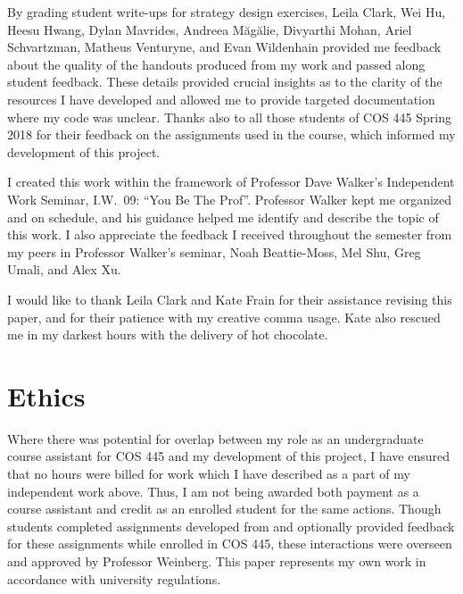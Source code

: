 \documentclass[pageno]{jpaper}
\begin{document}
By grading student write-ups for strategy design exercises, Leila Clark, Wei Hu, Heesu Hwang, Dylan Mavrides, Andreea M\u{a}g\u{a}lie, Divyarthi Mohan, Ariel Schvartzman, Matheus Venturyne, and Evan Wildenhain provided me feedback about the quality of the handouts produced from my work and passed along student feedback.
These details provided crucial insights as to the clarity of the resources I have developed and allowed me to provide targeted documentation where my code was unclear.
Thanks also to all those students of COS 445 Spring 2018 for their feedback on the assignments used in the course, which informed my development of this project.

I created this work within the framework of Professor Dave Walker's Independent Work Seminar, I.W.\ 09: ``You Be The Prof''.
Professor Walker kept me organized and on schedule, and his guidance helped me identify and describe the topic of this work.
I also appreciate the feedback I received throughout the semester from my peers in Professor Walker's seminar, Noah Beattie-Moss, Mel Shu, Greg Umali, and Alex Xu.

I would like to thank Leila Clark and Kate Frain for their assistance revising this paper, and for their patience with my creative comma usage.
Kate also rescued me in my darkest hours with the delivery of hot chocolate.

\section*{Ethics}
Where there was potential for overlap between my role as an undergraduate course assistant for COS 445 and my development of this project, I have ensured that no hours were billed for work which I have described as a part of my independent work above.
Thus, I am not being awarded both payment as a course assistant and credit as an enrolled student for the same actions.
Though students completed assignments developed from and optionally provided feedback for these assignments while enrolled in COS 445, these interactions were overseen and approved by Professor Weinberg.
This paper represents my own work in accordance with university regulations.

\medskip
\printbibliography[]
\end{document}
